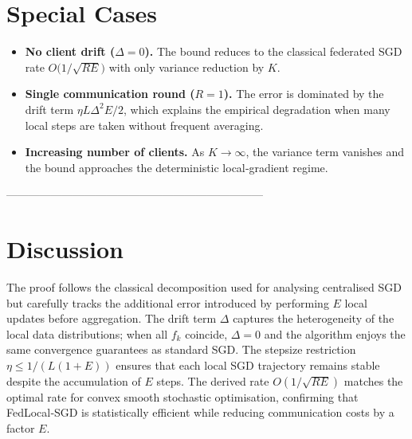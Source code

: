 \documentclass{article}
\begin{document}
\section*{Special Cases}
\begin{itemize}
    \item \textbf{No client drift ($\Delta=0$).}
          The bound reduces to the classical federated SGD rate
          $O\bigl(1/\sqrt{RE}\bigr)$ with only variance reduction by $K$.
    \item \textbf{Single communication round ($R=1$).}
          The error is dominated by the drift term $\eta L\Delta^{2}E/2$,
          which explains the empirical degradation when many local steps are
          taken without frequent averaging.
    \item \textbf{Increasing number of clients.}
          As $K\to\infty$, the variance term vanishes and the bound
          approaches the deterministic local‑gradient regime.
\end{itemize}

---------------------------------------------------------------------

\section*{Discussion}
The proof follows the classical decomposition used for analysing
centralised SGD but carefully tracks the additional error introduced by
performing $E$ local updates before aggregation. The drift term $\Delta$
captures the heterogeneity of the local data distributions; when all
$f_k$ coincide, $\Delta=0$ and the algorithm enjoys the same convergence
guarantees as standard SGD. The stepsize restriction $\eta\le 1/(L(1+E))$
ensures that each local SGD trajectory remains stable despite the
accumulation of $E$ steps. The derived rate $O(1/\sqrt{RE})$ matches the
optimal rate for convex smooth stochastic optimisation, confirming that
FedLocal‑SGD is statistically efficient while reducing communication
costs by a factor $E$.
\end{document}
